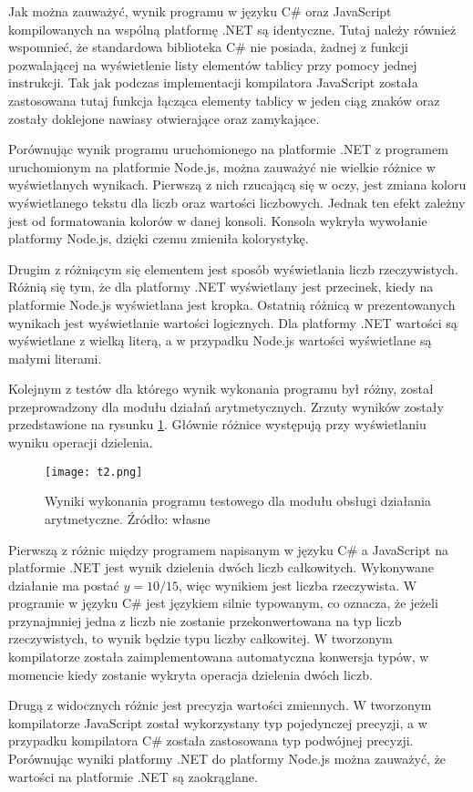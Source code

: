 \par Jak można zauważyć, wynik programu w języku C\# oraz JavaScript kompilowanych na wspólną platformę .NET są identyczne. Tutaj należy również wspomnieć, że standardowa biblioteka C\# nie posiada, żadnej z funkcji pozwalającej na wyświetlenie listy elementów tablicy przy pomocy jednej instrukcji. Tak jak podczas implementacji kompilatora JavaScript została zastosowana tutaj funkcja łącząca elementy tablicy w jeden ciąg znaków oraz zostały doklejone nawiasy otwierające oraz zamykające. 
\par Porównując wynik programu uruchomionego na platformie .NET z programem uruchomionym na platformie Node.js, można zauważyć nie wielkie różnice w wyświetlanych wynikach. Pierwszą z nich rzucającą się w oczy, jest zmiana koloru wyświetlanego tekstu dla liczb oraz wartości liczbowych. Jednak ten efekt zależny jest od formatowania kolorów w danej konsoli. Konsola wykryła wywołanie platformy Node.js, dzięki czemu zmieniła kolorystykę.
\par Drugim z różniącym się elementem jest sposób wyświetlania liczb rzeczywistych. Różnią się tym, że dla platformy .NET wyświetlany jest przecinek, kiedy na platformie Node.js wyświetlana jest kropka. Ostatnią różnicą w prezentowanych wynikach jest wyświetlanie wartości logicznych. Dla platformy .NET wartości są wyświetlane z wielką literą, a w przypadku Node.js wartości wyświetlane są małymi literami.

\par Kolejnym z testów dla którego wynik wykonania programu był różny, został przeprowadzony dla modułu działań arytmetycznych. Zrzuty wyników zostały przedstawione na rysunku \ref{fig:result2}. Głównie różnice występują przy wyświetlaniu wyniku operacji dzielenia.

\begin{figure}[!h]
	\centering
  \texttt{[image: t2.png]}
	\caption{Wyniki wykonania programu testowego dla modułu obsługi działania arytmetyczne. Źródło: własne}
	\label{fig:result2}
\end{figure}

\par Pierwszą z różnic między programem napisanym w języku C\# a JavaScript na platformie .NET jest wynik dzielenia dwóch liczb całkowitych. Wykonywane działanie ma postać $y = 10 / 15$, więc wynikiem jest liczba rzeczywista. W programie w języku C\# jest językiem silnie typowanym, co oznacza, że jeżeli przynajmniej jedna z liczb nie zostanie przekonwertowana na typ liczb rzeczywistych, to wynik będzie typu liczby całkowitej. W tworzonym kompilatorze została zaimplementowana automatyczna konwersja typów, w momencie kiedy zostanie wykryta operacja dzielenia dwóch liczb.
\par Drugą z widocznych różnic jest precyzja wartości zmiennych. W tworzonym kompilatorze JavaScript został wykorzystany typ pojedynczej precyzji, a w przypadku kompilatora C\# została zastosowana typ podwójnej precyzji. Porównując wyniki platformy .NET do platformy Node.js można zauważyć, że wartości na platformie .NET są zaokrąglane.


